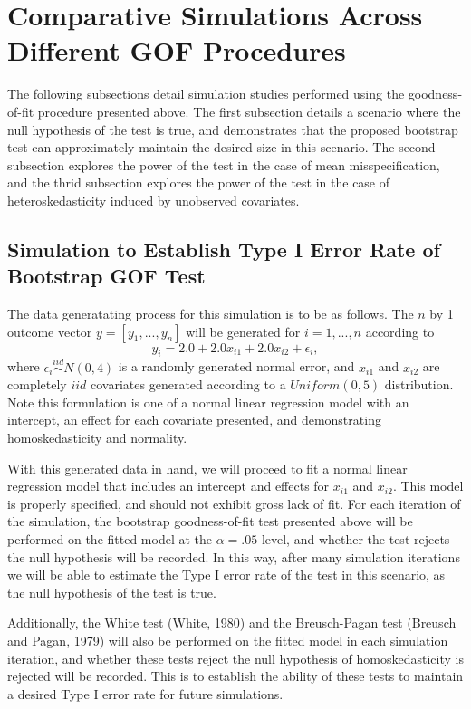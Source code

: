 		\section{Comparative Simulations Across Different GOF Procedures} \label{sec:gof_sim}

		The following subsections detail simulation studies performed using the goodness-of-fit procedure presented above. The first subsection details a scenario where the null
		hypothesis of the test is true, and demonstrates that the proposed bootstrap test can approximately maintain the desired size in this scenario. The second subsection 
		explores the power of the test in the case of mean misspecification, and the thrid subsection explores the power of the test in the case of heteroskedasticity induced by
		unobserved covariates.

		\subsection{Simulation to Establish Type I Error Rate of Bootstrap GOF Test}

		The data generatating process for this simulation is to be as follows. The $n$ by 1 outcome vector $y = [y_1,...,y_n]$ will be generated for $i = 1,...,n$ according
		to
		\begin{equation}
			y_i = 2.0 + 2.0 x_{i1} + 2.0 x_{i2} + \epsilon_i , 
		\end{equation}
		where $\epsilon_i \stackrel{iid}{\sim} N(0,4)$ is a randomly generated normal error, and $x_{i1}$ and $x_{i2}$ are completely $iid$ covariates generated according to
		a $Uniform(0,5)$ distribution. Note this formulation is one of a normal linear regression model with an intercept, an effect for each covariate presented, and
		demonstrating homoskedasticity and normality.

		With this generated data in hand, we will proceed to fit a normal linear regression model that includes an intercept and effects for $x_{i1}$ and $x_{i2}$. This model
		is properly specified, and should not exhibit gross lack of fit. For each iteration of the simulation, the bootstrap goodness-of-fit test presented above will be
		performed on the fitted model at the $\alpha = .05$ level, and whether the test rejects the null hypothesis will be recorded. In this way, after many simulation iterations
		we will be able to estimate the Type I error rate of the test in this scenario, as the null hypothesis of the test is true.

		Additionally, the White test (White, 1980) and the Breusch-Pagan test (Breusch and Pagan, 1979) will also be performed on the fitted model in each simulation iteration, and
		whether these tests reject the null hypothesis of homoskedasticity is rejected will be recorded. This is to establish the ability of these tests to maintain a desired Type
		I error rate for future simulations.

